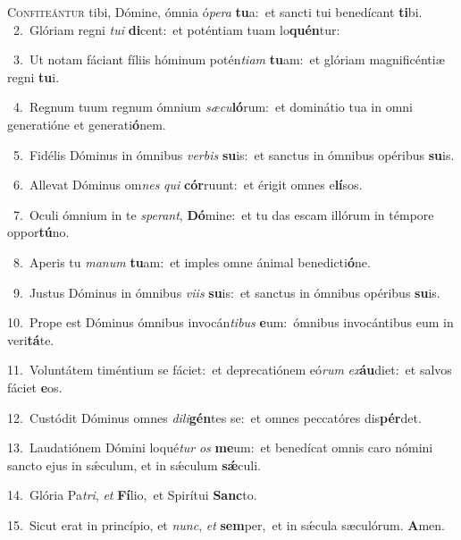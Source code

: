 \lettrine{\initial\textcolor{\initialcolor}{C}}{onfiteántur} tibi, Dómine, ómnia ó\-\textit{pe}\-\textit{ra} \textbf{tu}\-a:~\star et sancti tui benedícant \textbf{ti}\-bi.\\
{\numbfont\textcolor{\numbcolor}{~2.}}~Glóriam regni \textit{tu}\-\textit{i} \textbf{di}\-cent:~\star et poténtiam tuam lo\-\textbf{quén}\-tur:\par
{\numbfont\textcolor{\numbcolor}{~3.}}~Ut notam fáciant fíliis hóminum potén\-\textit{ti}\-\textit{am} \textbf{tu}\-am:~\star et glóriam magnificéntiæ regni \textbf{tu}\-i.\par
{\numbfont\textcolor{\numbcolor}{~4.}}~Regnum tuum regnum ómnium \textit{sæ}\-\textit{cu}\textbf{ló}rum:~\star et dominátio tua in omni generatióne et generati\-\textbf{ó}\-nem.\par
{\numbfont\textcolor{\numbcolor}{~5.}}~Fidélis Dóminus in ómnibus \textit{ver}\-\textit{bis} \textbf{su}\-is:~\star et sanctus in ómnibus opéribus \textbf{su}\-is.\par
{\numbfont\textcolor{\numbcolor}{~6.}}~Allevat Dóminus om\textit{nes} \textit{qui} \textbf{cór}\-ruunt:~\star et érigit omnes e\-\textbf{lí}\-sos.\par
{\numbfont\textcolor{\numbcolor}{~7.}}~Oculi ómnium in te \textit{spe}\-\textit{rant}, \textbf{Dó}\-mine:~\star et tu das escam illórum in témpore oppor\-\textbf{tú}\-no.\par
{\numbfont\textcolor{\numbcolor}{~8.}}~Aperis tu \textit{ma}\-\textit{num} \textbf{tu}\-am:~\star et imples omne ánimal benedicti\-\textbf{ó}\-ne.\par
{\numbfont\textcolor{\numbcolor}{~9.}}~Justus Dóminus in ómnibus \textit{vi}\-\textit{is} \textbf{su}\-is:~\star et sanctus in ómnibus opéribus \textbf{su}\-is.\par
{\numbfont\textcolor{\numbcolor}{10.}}~Prope est Dóminus ómnibus invocán\-\textit{ti}\-\textit{bus} \textbf{e}\-um:~\star ómnibus invocántibus eum in veri\-\textbf{tá}\-te.\par
{\numbfont\textcolor{\numbcolor}{11.}}~Voluntátem timéntium se fáciet:~\dagger et deprecatiónem eó\textit{rum} \textit{ex}\-\textbf{áu}diet:~\star et salvos fáciet \textbf{e}\-os.\par
{\numbfont\textcolor{\numbcolor}{12.}}~Custódit Dóminus omnes \textit{di}\-\textit{li}\textbf{gén}tes se:~\star et omnes peccatóres dis\-\textbf{pér}\-det.\par
{\numbfont\textcolor{\numbcolor}{13.}}~Laudatiónem Dómini loqué\textit{tur} \textit{os} \textbf{me}\-um:~\star et benedícat omnis caro nómini sancto ejus in sǽculum, et in sǽculum \textbf{sǽ}\-culi.\par
{\numbfont\textcolor{\numbcolor}{14.}}~Glória Pa\-\textit{tri}\-, \textit{et} \textbf{Fí}\-lio,~\star et Spirítui \textbf{Sanc}\-to.\par
{\numbfont\textcolor{\numbcolor}{15.}}~Sicut erat in princípio, et \textit{nunc}\-, \textit{et} \textbf{sem}\-per,~\star et in sǽcula sæculórum. \textbf{A}\-men.\par
